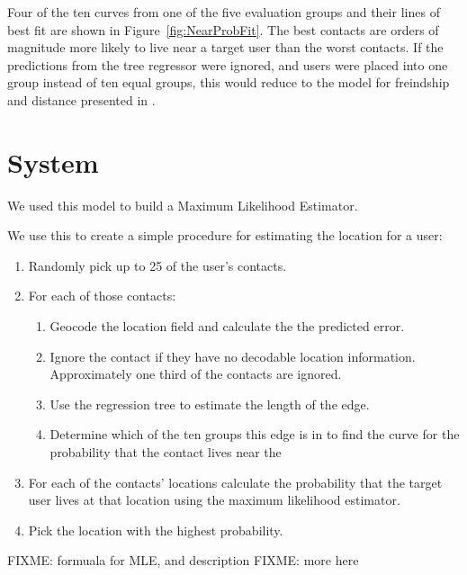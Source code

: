 Four of the ten curves from one of the five evaluation groups and their lines
of best fit are shown in Figure~\ref{fig:NearProbFit}.
%
The best contacts are orders of magnitude more
likely to live near a target user than the worst contacts.
%
If the predictions from the tree regressor were ignored, and users were placed
into one group instead of ten equal groups, this would reduce to the model
for freindship and distance presented in \cite{backstrom2010find}.


\section{System}
We used this model to build a Maximum Likelihood Estimator.


We use this to create a simple procedure for estimating the location for a user:
\begin{enumerate}
\item Randomly pick up to 25 of the user's contacts.
\item For each of those contacts:
\begin{enumerate}
    \item Geocode the location field and calculate the the predicted error.
    \item Ignore the contact if they have no decodable location information.
    Approximately one third of the contacts are ignored.
    \item Use the regression tree to estimate the length of the edge.
    \item Determine which of the ten groups this edge is in to find the curve
        for the probability that the contact lives near the
\end{enumerate}
\item For each of the contacts' locations calculate the probability that the
target user lives at that location using the maximum likelihood estimator.
\item Pick the location with the highest probability.
\end{enumerate}

FIXME: formuala for MLE, and description
FIXME: more here

